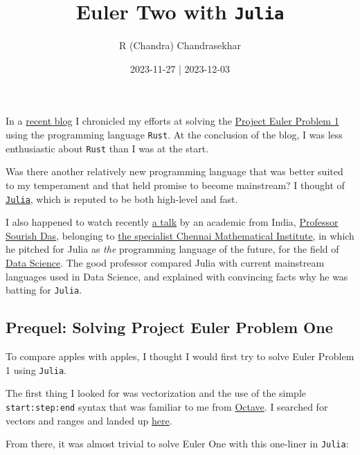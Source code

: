 \documentclass[
  a4paper,
]{article}
\title{Euler Two with \texttt{Julia}}
\author{R (Chandra) Chandrasekhar}
\date{2023-11-27 | 2023-12-03}
\begin{document}
\maketitle

\thispagestyle{empty}


In a
\href{https://swanlotus.netlify.app/blogs/a-foray-into-rust-euler-one}{recent
blog} I chronicled my efforts at solving the
\href{https://projecteuler.net/problem=1}{Project Euler Problem 1} using
the programming language \texttt{Rust}. At the conclusion of the blog, I
was less enthusiastic about \texttt{Rust} than I was at the start.

Was there another relatively new programming language that was better
suited to my temperament and that held promise to become mainstream? I
thought of \href{https://julialang.org/}{\texttt{Julia}}, which is
reputed to be both high-level and fast.

I also happened to watch recently
\href{https://www.youtube.com/watch?v=rgcwvrGGFww}{a talk} by an
academic from India,
\href{https://www.cmi.ac.in/people/fac-profile.php?id=sourish}{Professor
Sourish Das}, belonging to \href{https://www.cmi.ac.in/}{the specialist
Chennai Mathematical Institute}, in which he pitched for Julia as
\emph{the} programming language of the future, for the field of
\href{https://en.wikipedia.org/wiki/Data_science}{Data Science}. The
good professor compared Julia with current mainstream languages used in
Data Science, and explained with convincing facts why he was batting for
\texttt{Julia}.

\hypertarget{prequel-solving-project-euler-problem-one}{%
\subsection{Prequel: Solving Project Euler Problem
One}\label{prequel-solving-project-euler-problem-one}}

To compare apples with apples, I thought I would first try to solve
Euler Problem 1 using \texttt{Julia}.

The first thing I looked for was vectorization and the use of the simple
\texttt{start:step:end} syntax that was familiar to me from
\href{https://octave.org/}{Octave}. I searched for vectors and ranges
and landed up
\href{https://docs.juliahub.com/CalculusWithJulia/AZHbv/0.0.5/precalc/ranges.html}{here}.

From there, it was almost trivial to solve Euler One with this one-liner
in \texttt{Julia}:
\end{document}
